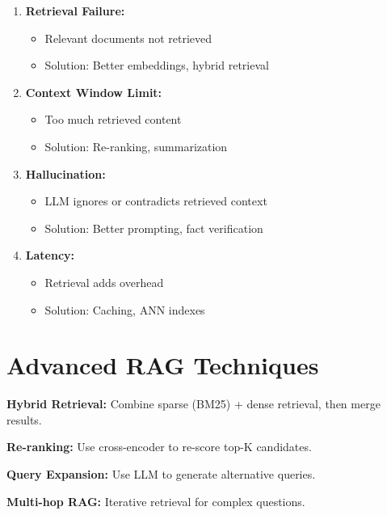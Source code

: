 \begin{warningbox}
\begin{enumerate}
    \item \textbf{Retrieval Failure:}
    \begin{itemize}
        \item Relevant documents not retrieved
        \item Solution: Better embeddings, hybrid retrieval
    \end{itemize}

    \item \textbf{Context Window Limit:}
    \begin{itemize}
        \item Too much retrieved content
        \item Solution: Re-ranking, summarization
    \end{itemize}

    \item \textbf{Hallucination:}
    \begin{itemize}
        \item LLM ignores or contradicts retrieved context
        \item Solution: Better prompting, fact verification
    \end{itemize}

    \item \textbf{Latency:}
    \begin{itemize}
        \item Retrieval adds overhead
        \item Solution: Caching, ANN indexes
    \end{itemize}
\end{enumerate}
\end{warningbox}

\section{Advanced RAG Techniques}

\begin{infobox}
\textbf{Hybrid Retrieval:}
Combine sparse (BM25) + dense retrieval, then merge results.

\textbf{Re-ranking:}
Use cross-encoder to re-score top-K candidates.

\textbf{Query Expansion:}
Use LLM to generate alternative queries.

\textbf{Multi-hop RAG:}
Iterative retrieval for complex questions.
\end{infobox}

